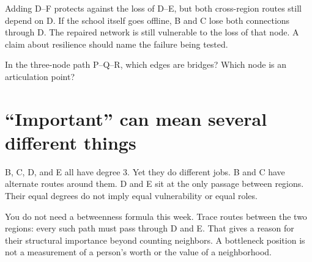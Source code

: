 \documentclass[11pt,letterpaper]{article}
\begin{document}
Adding D--F protects against the loss of D--E, but both cross-region routes still depend on D. If the school itself goes offline, B and C lose both connections through D. The repaired network is still vulnerable to the loss of that node. A claim about resilience should name the failure being tested.



\begin{tcolorbox}[title={Pause and try 5},breakable]
In the three-node path P--Q--R, which edges are bridges? Which node is an articulation point?
\end{tcolorbox}



\section{``Important'' can mean several different things}


B, C, D, and E all have degree 3. Yet they do different jobs. B and C have alternate routes around them. D and E sit at the only passage between regions. Their equal degrees do not imply equal vulnerability or equal roles.



\par{}\par\medskip


You do not need a betweenness formula this week. Trace routes between the two regions: every such path must pass through D and E. That gives a reason for their structural importance beyond counting neighbors. A bottleneck position is not a measurement of a person's worth or the value of a neighborhood.
\end{document}

